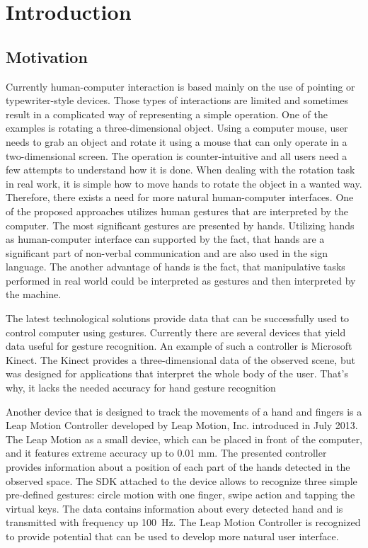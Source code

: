 
\chapter{Introduction} %

\section{Motivation}

Currently human-computer interaction is based mainly on the use of pointing or typewriter-style devices. 
Those types of interactions are limited and sometimes result in a complicated way of representing a simple operation.
One of the examples is rotating a three-dimensional object.
Using a computer mouse, user needs to grab an object and rotate it using a mouse that can only operate in a two-dimensional screen. 
The operation is counter-intuitive and all users need a few attempts to understand how it is done. 
When dealing with the rotation task in real work, it is simple how to move hands to rotate the object in a wanted way.
Therefore, there exists a need for more natural human-computer interfaces.
One of the proposed approaches utilizes human gestures that are interpreted by the computer.
The most significant gestures are presented by hands.
Utilizing hands as human-computer interface can supported by the fact, that hands are a significant part of non-verbal communication and are also used in the sign language.
The another advantage of hands is the fact, that manipulative tasks performed in real world could be interpreted as gestures and then interpreted by the machine.

The latest technological solutions provide data that can be successfully used to control computer using gestures.
Currently there are several devices that yield data useful for gesture recognition. 
An example of such a controller is Microsoft Kinect.
The Kinect provides a three-dimensional data of the observed scene, but was designed for applications that interpret the whole body of the user. 
That's why, it lacks the needed accuracy for hand gesture recognition
 
Another device that is designed to track the movements of a hand and fingers is a Leap Motion Controller developed by Leap Motion, Inc. introduced in July 2013. 
The Leap Motion as a small device, which can be placed in front of the computer, and it features extreme accuracy up to 0.01 mm. 
The presented controller provides information about a position of each part of the hands detected in the observed space.
The SDK attached to the device allows to recognize three simple pre-defined gestures: circle motion with one finger, swipe action and tapping the virtual keys. 
The data contains information about every detected hand and is transmitted with frequency up 100~Hz. 
The Leap Motion Controller is recognized to provide potential that can be used to develop more natural user interface. 

